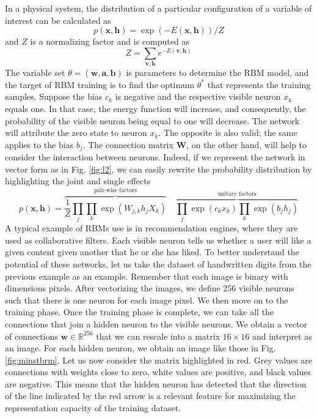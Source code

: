 In a physical system, the distribution of a particular configuration of a variable of interest can be calculated as 
\begin{equation}
p(\mathbf{x}, \mathbf{h})=\exp (-E(\mathbf{x}, \mathbf{h})) / Z
\end{equation}
and $Z$ is a normalizing factor and is computed as 
\begin{equation}
Z=\sum_{\mathbf{v}, \mathbf{h}} e^{-E(\mathbf{v}, \mathbf{h})}
\end{equation}
The variable set $\theta=(\mathbf{w}, \mathbf{a}, \mathbf{b})$ is parameters to determine the RBM model, and the target of RBM training is to find the optimum $\theta^*$ that represents the training samples.
Suppose the bias $c_k$ is negative and the respective visible neuron $x_k$ equals one. In that case, the energy function will increase, and consequently, the probability of the visible neuron being equal to one will decrease. The network will attribute the zero state to neuron $x_k$. The opposite is also valid; the same applies to the bias $b_j$. The connection matrix $\mathbf{W}$, on the other hand, will help to consider the interaction between neurons. Indeed, if we represent the network in vector form as in Fig. \ref{fig:l2}, we can easily rewrite the probability distribution by highlighting the joint and single effects
\begin{equation}
p\left(\mathbf{x},\mathbf{h}\right) = \overbrace{\frac{1}{Z}\prod_j \prod_k \exp\left(W_{j,k}h_jX_k\right)}^\text{pair-wise factors} \quad \overbrace{\prod_j \exp\left(c_kx_k\right) \prod_k \exp\left(b_jh_j\right)}^\text{unitary factors}
\end{equation}
A typical example of RBMs use is in recommendation engines, where they are used as collaborative filters. Each visible neuron tells us whether a user will like a given content given another that he or she has liked. To better understand the potential of these networks, let us take the dataset of handwritten digits from the previous example as an example. Remember that each image is binary with dimensions  pixels. After vectorizing the images, we define 256 visible neurons such that there is one neuron for each image pixel. We then move on to the training phase. Once the training phase is complete, we can take all the connections that join a hidden neuron to the visible neurons. We obtain a vector of connections $\mathbf{w} \in \mathbb{R}^256$ that we can rescale into a matrix $16 \times 16$ and interpret as an image. For each hidden neuron, we obtain an image like those in Fig. \ref{fig:minstbrm}. Let us now consider the matrix highlighted in red. Grey values are connections with weights close to zero, white values are positive, and black values are negative. This means that the hidden neuron has detected that the direction of the line indicated by the red arrow is a relevant feature for maximizing the representation capacity of the training dataset.
